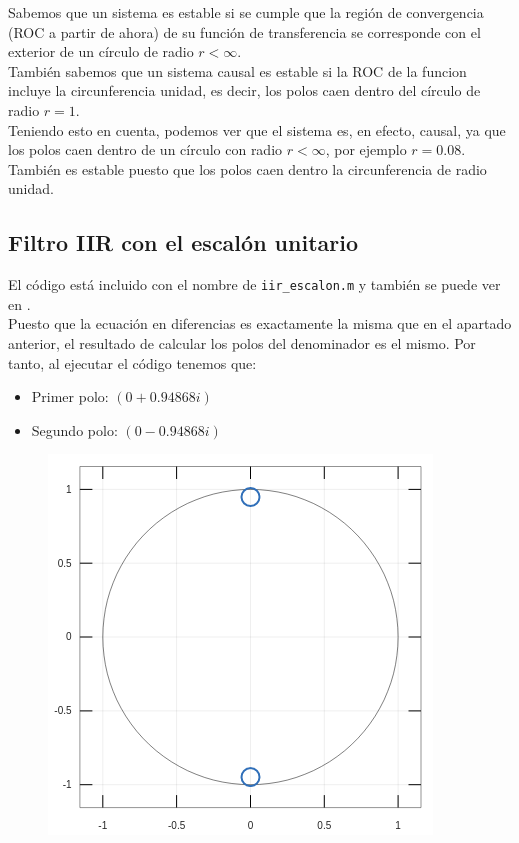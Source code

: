 \documentclass[11pt,a4paper]{article}
\begin{document}
	Sabemos que un sistema es estable si se cumple que la región de convergencia (ROC a partir de ahora) de su función de transferencia se corresponde con el exterior de un círculo de radio $r<\infty$.\\
	
	También sabemos que un sistema causal es estable si la ROC de la funcion incluye la circunferencia unidad, es decir, los polos caen dentro del círculo de radio $r=1$.\\
	
	Teniendo esto en cuenta, podemos ver que el sistema es, en efecto, causal, ya que los polos caen dentro de un círculo con radio $r<\infty$, por ejemplo $r=0.08$.  También es estable puesto que los polos caen dentro la circunferencia de radio unidad.
	
\subsection{Filtro IIR con el escalón unitario}

El código está incluido con el nombre de \texttt{iir\_escalon.m} y también se puede ver en \color{deepred}\color{black}.\\

Puesto que la ecuación en diferencias es exactamente la misma que en el apartado anterior, el resultado de calcular los polos del denominador es el mismo. Por tanto, al ejecutar el código tenemos que:

	\begin{itemize}
		\item Primer polo: $(0 + 0.94868i)$
		\item Segundo polo: $(0 - 0.94868i)$
	\end{itemize}
	
\begin{figure}[H]
  \centering
  \includegraphics[width=0.5\linewidth]{img/polosg1.png}
\end{figure}
\end{document}
